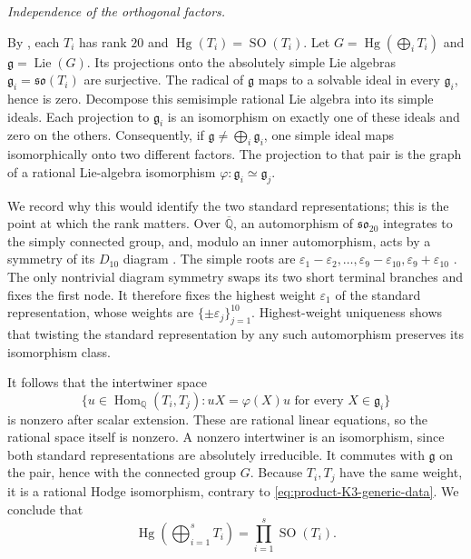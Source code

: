 \emph{Independence of the orthogonal factors.}\par
By \citet[Theorem~2.2.1 and Example~2.2.3, p.~211]{frZarhin1983},
each $T_i$ has rank $20$ and $\operatorname{Hg}(T_i)=\operatorname{SO}(T_i)$.
Let $G=\operatorname{Hg}(\bigoplus_iT_i)$ and
$\mathfrak g=\operatorname{Lie}(G)$. Its projections onto the
absolutely simple Lie algebras
$\mathfrak g_i=\mathfrak{so}(T_i)$ are surjective.
The radical of $\mathfrak g$ maps to a solvable ideal in every
$\mathfrak g_i$, hence is zero. Decompose this semisimple rational
Lie algebra into its simple ideals. Each projection to
$\mathfrak g_i$ is an isomorphism on exactly one of these ideals and
zero on the others. Consequently, if
$\mathfrak g\ne\bigoplus_i\mathfrak g_i$, one simple ideal maps
isomorphically onto two different factors. The projection to that
pair is the graph of a rational Lie-algebra isomorphism
$\varphi:\mathfrak g_i\simeq\mathfrak g_j$.

We record why this would identify the two standard representations;
this is the point at which the rank matters. Over $\overline{\mathbb Q}$,
an automorphism of $\mathfrak{so}_{20}$ integrates to the simply
connected group, and, modulo an inner automorphism, acts by a
symmetry of its $D_{10}$ diagram
\citep[20.33, p.~108, and 21.4, p.~112]{frMilneReductive2018}.
The simple roots are
$\varepsilon_1-\varepsilon_2,\ldots,
\varepsilon_9-\varepsilon_{10},\varepsilon_9+\varepsilon_{10}$
\citep[18.26--18.27, pp.~91--92]{frMilneReductive2018}.
The only nontrivial diagram symmetry swaps its two short terminal
branches and fixes the first node. It therefore fixes the highest
weight $\varepsilon_1$ of the standard representation, whose weights
are $\{\pm\varepsilon_j\}_{j=1}^{10}$. Highest-weight uniqueness
\citep[20.3--20.4, pp.~102--103]{frMilneReductive2018}
shows that twisting the standard representation by any such
automorphism preserves its isomorphism class.

It follows that the intertwiner space
\[
 \{u\in\operatorname{Hom}_{\mathbb Q}(T_i,T_j):
          uX=\varphi(X)u\text{ for every }X\in\mathfrak g_i\}
\]
is nonzero after scalar extension. These are rational linear equations,
so the rational space itself is nonzero. A nonzero intertwiner is an
isomorphism, since both standard representations are absolutely
irreducible. It commutes with $\mathfrak g$ on the pair, hence with
the connected group $G$. Because $T_i,T_j$ have the same weight, it
is a rational Hodge isomorphism, contrary to
\eqref{eq:product-K3-generic-data}. We conclude that
\[
       \operatorname{Hg}\left(\bigoplus_{i=1}^sT_i\right)
                          =\prod_{i=1}^s\operatorname{SO}(T_i).
\]

